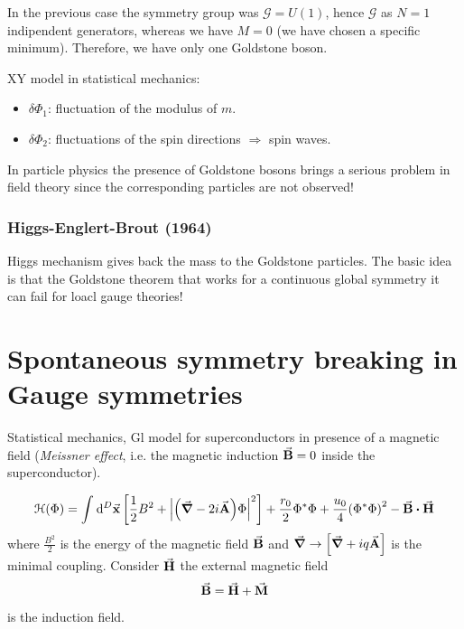 \documentclass[../main/main.tex]{subfiles}
\begin{document}
In the previous case the symmetry group was \( \mathcal{G} = U (1) \), hence \( \mathcal{G} \) as \( N=1 \) indipendent generators, whereas we have \( M=0 \) (we have chosen a specific minimum). Therefore, we have only one Goldstone boson.


\begin{example}{}{}
XY model in statistical mechanics:
\begin{itemize}
\item \( \delta \Phi _1 \): fluctuation of the modulus of \( m \).
\item \( \delta \Phi _2 \): fluctuations of the spin directions \( \Rightarrow  \) spin waves.
\end{itemize}
\end{example}
\begin{remark}
In particle physics the presence of Goldstone bosons brings a serious problem in field theory since the corresponding particles are not observed!
\end{remark}

\subsubsection{Higgs-Englert-Brout (1964)}
Higgs mechanism gives back the mass to the Goldstone particles.
The basic idea is that the Goldstone theorem that works for a continuous global symmetry it can fail for loacl gauge theories!














\section{Spontaneous symmetry breaking in Gauge symmetries}
Statistical mechanics, Gl model for superconductors in presence of a magnetic field (\emph{Meissner effect}, i.e. the magnetic induction \( \va{B} = 0 \) inside the superconductor).

\begin{equation}
  \mathcal{H} (\Phi ) = \int_{}^{} \dd[D]{\va{x}} \qty[\frac{1}{2}B^2 + \abs{\qty(\va{\grad }- 2 i \va{A})\Phi  }^2 ] + \frac{r_0}{2} \Phi ^* \Phi
  + \frac{u_0}{4} \qty(\Phi ^* \Phi )^2 - \va{B} \vdot \va{H}
\end{equation}
where \( \frac{B^2}{2} \) is the energy of the magnetic field \( \va{B} \) and \( \va{\grad } \rightarrow \qty[\va{\grad } + i q \va{A}]  \) is the minimal coupling.
Consider \( \va{H} \) the external magnetic field
\begin{equation}
  \va{B} = \va{H} + \va{M}
\end{equation}
is the induction field.
\end{document}

